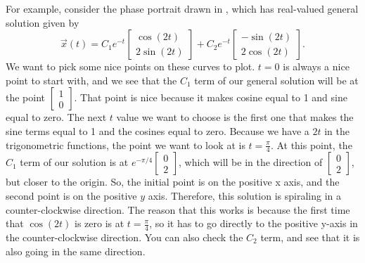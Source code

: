 For example, consider the phase portrait drawn in , which has real-valued general solution given by \[ \vec{x}(t) = C_1 e^{-t}
\begin{bmatrix} \cos (2t) \\ 2 \sin (2t)  \end{bmatrix} + C_2 e^{-t}
\begin{bmatrix} -\sin (2t) \\ 2 \cos (2t) \end{bmatrix}.\] We want to pick some nice points on these curves to plot. $t=0$ is always a nice point to start with, and we see that the $C_1$ term of our general solution will be at the point $\left[\begin{smallmatrix} 1 \\ 0 \end{smallmatrix}\right]$. That point is nice because it makes cosine equal to 1 and sine equal to zero. The next $t$ value we want to choose is the first one that makes the sine terms equal to 1 and the cosines equal to zero. Because we have a $2t$ in the trigonometric functions, the point we want to look at is $t = \frac{\pi}{4}$. At this point, the $C_1$ term of our solution is at $e^{-\pi/4}\left[\begin{smallmatrix} 0 \\ 2 \end{smallmatrix}\right]$, which will be in the direction of $\left[\begin{smallmatrix} 0 \\ 2 \end{smallmatrix}\right]$, but closer to the origin. So, the initial point is on the positive x axis, and the second point is on the positive $y$ axis. Therefore, this solution is spiraling in a counter-clockwise direction. The reason that this works is because the first time that $\cos(2t)$ is zero is at $t = \frac{\pi}{4}$, so it has to go directly to the positive y-axis in the counter-clockwise direction. You can also check the $C_2$ term, and see that it is also going in the same direction.

